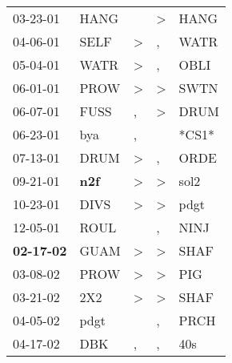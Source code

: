 \begin{supertabular}{p{0.07\textwidth}p{0.06\textwidth}p{0.02\textwidth}p{0.02\textwidth}p{0.06\textwidth}}
          03-23-01\textsuperscript{} &           HANG\textsuperscript{} &                  &  \textgreater &  HANG\textsuperscript{} \\
          04-06-01\textsuperscript{} &           SELF\textsuperscript{} &     \textgreater &             , &  WATR\textsuperscript{} \\
          05-04-01\textsuperscript{} &           WATR\textsuperscript{} &     \textgreater &             , &  OBLI\textsuperscript{} \\
          06-01-01\textsuperscript{} &           PROW\textsuperscript{} &     \textgreater &  \textgreater &  SWTN\textsuperscript{} \\
          06-07-01\textsuperscript{} &           FUSS\textsuperscript{} &                , &  \textgreater &  DRUM\textsuperscript{} \\
          06-23-01\textsuperscript{} &            bya\textsuperscript{} &                , &               &                   *CS1* \\
          07-13-01\textsuperscript{} &           DRUM\textsuperscript{} &     \textgreater &             , &  ORDE\textsuperscript{} \\
          09-21-01\textsuperscript{} &   \textbf{n2f\textsuperscript{}} &     \textgreater &  \textgreater &  sol2\textsuperscript{} \\
          10-23-01\textsuperscript{} &           DIVS\textsuperscript{} &     \textgreater &  \textgreater &  pdgt\textsuperscript{} \\
          12-05-01\textsuperscript{} &           ROUL\textsuperscript{} &                  &             , &  NINJ\textsuperscript{} \\
 \textbf{02-17-02\textsuperscript{}} &           GUAM\textsuperscript{} &     \textgreater &  \textgreater &  SHAF\textsuperscript{} \\
          03-08-02\textsuperscript{} &           PROW\textsuperscript{} &     \textgreater &  \textgreater &   PIG\textsuperscript{} \\
          03-21-02\textsuperscript{} &            2X2\textsuperscript{} &     \textgreater &  \textgreater &  SHAF\textsuperscript{} \\
          04-05-02\textsuperscript{} &           pdgt\textsuperscript{} &                  &             , &  PRCH\textsuperscript{} \\
          04-17-02\textsuperscript{} &            DBK\textsuperscript{} &                , &             , &   40s\textsuperscript{} \\

\end{supertabular}
